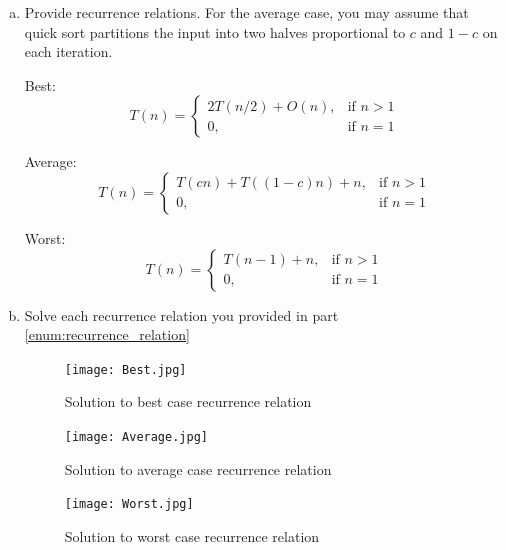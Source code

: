 \documentclass[english]{article}
\begin{document}
\begin{enumerate}[(a)]
  \item Provide recurrence relations. For the average case, you may assume that quick sort partitions the input into two halves proportional to $c$ and $1 - c$ on each iteration.
  \label{enum:recurrence_relation}

  Best:
  \begin{equation}
    T(n) = \begin{cases}
      2T(n/2) + O(n), & \text{if } n > 1 \\
      0, & \text{if } n = 1
    \end{cases}
  \end{equation}

  Average:
  \begin{equation}
    T(n) = \begin{cases}
      T(cn) + T((1 - c)n) + n, & \text{if } n > 1 \\
      0, & \text{if } n = 1
    \end{cases}
  \end{equation}
  
  Worst:
  \begin{equation}
    T(n) = \begin{cases}
      T(n-1) + n, & \text{if } n > 1 \\
      0, & \text{if } n = 1
    \end{cases}
  \end{equation}

  \item Solve each recurrence relation you provided in part \ref{enum:recurrence_relation}

  \begin{figure}[H]
    \centering
    \texttt{[image: Best.jpg]}
    \caption{Solution to best case recurrence relation}%
    \label{fig:recurrence_solution}
  \end{figure} 
  \begin{figure}[H]
    \centering
    \texttt{[image: Average.jpg]}
    \caption{Solution to average case recurrence relation}%
    \label{fig:recurrence_solution}
  \end{figure}  
  \begin{figure}[H]
    \centering
    \texttt{[image: Worst.jpg]}
    \caption{Solution to worst case recurrence relation}%
    \label{fig:recurrence_solution}
  \end{figure}  


\end{enumerate}
\end{document}
